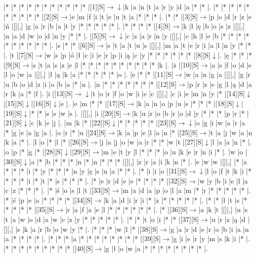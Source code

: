 \documentclass[11pt]{article}
\newcommand\drarr{$\rightarrow \!\!\!\!\! \downarrow$}
\newcommand\rarr{$\rightarrow$}
\newcommand\darr{$\downarrow$}
\begin{document}
\noindent\begin{Puzzle}{22}{29}|*	|*	|*	|*	|*	|*	|*	|*	|*	|*	|*	|[1][S]\drarr	|k	|a	|n	|t	|a	|r	|y	|d	|a	|*	|*	|.
|*	|*	|*	|*	|*	|*	|*	|*	|*	|*	|[2][S]\rarr	|e	|m	|f	|i	|t	|e	|u	|t	|a	|*	|*	|*	|.
|*	|*	|[3][S]\rarr	|p	|o	|d	|r	|z	|e	|ń	|[][,]{ }	|g	|a	|r	|b	|a	|t	|y	|*	|*	|*	|*	|*	|.
|*	|*	|*	|*	|[4][S]\rarr	|k	|ł	|ę	|b	|o	|s	|z	|[][,]{ }	|n	|a	|d	|w	|o	|d	|n	|y	|*	|*	|.
|[5][S]\drarr	|c	|z	|a	|r	|n	|y	|[][,]{ }	|c	|h	|l	|e	|b	|*	|*	|*	|*	|*	|*	|*	|*	|*	|*	|.
|s	|*	|*	|[6][S]\rarr	|s	|t	|a	|t	|u	|s	|[][,]{ }	|m	|a	|t	|e	|r	|i	|a	|l	|n	|y	|*	|*	|.
|t	|[7][S]\rarr	|w	|s	|p	|ó	|ł	|c	|i	|e	|r	|p	|i	|ą	|c	|y	|*	|*	|*	|*	|*	|*	|[8][S]\darr	|.
|ę	|*	|*	|*	|[9][S]\rarr	|s	|t	|a	|s	|z	|e	|l	|*	|*	|*	|*	|*	|*	|*	|*	|*	|*	|k	|.
|ż	|[10][S]\rarr	|a	|s	|f	|o	|d	|e	|l	|o	|w	|a	|[][,]{ }	|ł	|ą	|k	|a	|*	|*	|*	|*	|*	|o	|.
|e	|*	|*	|[11][S]\rarr	|w	|a	|n	|g	|a	|[][,]{ }	|g	|r	|u	|b	|o	|d	|z	|i	|o	|b	|a	|*	|n	|.
|n	|*	|*	|*	|*	|*	|*	|*	|[12][S]\rarr	|p	|r	|z	|e	|g	|l	|ą	|d	|a	|r	|k	|a	|*	|f	|.
|i	|[13][S]\drarr	|t	|o	|r	|f	|o	|w	|i	|e	|c	|[][,]{ }	|c	|i	|e	|m	|n	|y	|*	|[14][S]\darr	|[15][S]\darr	|[16][S]\darr	|e	|.
|e	|m	|*	|*	|[17][S]\rarr	|k	|a	|n	|o	|p	|u	|s	|*	|*	|*	|[18][S]\darr	|[19][S]\darr	|*	|*	|s	|s	|w	|s	|.
|[][,]{ }	|i	|[20][S]\rarr	|k	|u	|r	|o	|b	|r	|o	|d	|y	|*	|*	|*	|p	|r	|*	|[21][S]\darr	|c	|k	|e	|j	|.
|m	|k	|*	|[22][S]\darr	|*	|*	|*	|*	|*	|[23][S]\drarr	|o	|g	|i	|w	|a	|r	|a	|*	|g	|e	|a	|g	|a	|.
|o	|r	|*	|u	|[24][S]\rarr	|k	|a	|p	|e	|l	|a	|n	|*	|[25][S]\rarr	|t	|a	|j	|w	|a	|n	|k	|a	|*	|.
|l	|o	|*	|l	|*	|[26][S]\rarr	|j	|a	|j	|o	|w	|a	|r	|*	|*	|w	|t	|[27][S]\darr	|l	|a	|a	|n	|*	|.
|o	|p	|*	|g	|*	|[28][S]\darr	|[29][S]\rarr	|m	|e	|t	|y	|l	|*	|*	|*	|o	|u	|k	|e	|r	|n	|i	|*	|.
|w	|o	|[30][S]\darr	|a	|*	|b	|*	|*	|*	|n	|*	|n	|*	|*	|*	|[][,]{ }	|z	|r	|a	|i	|k	|n	|*	|.
|e	|w	|w	|[][,]{ }	|*	|a	|*	|*	|*	|i	|*	|y	|*	|*	|*	|n	|y	|ę	|s	|u	|a	|*	|*	|.
|*	|i	|i	|o	|[31][S]\drarr	|l	|o	|f	|t	|k	|i	|*	|*	|*	|*	|i	|*	|t	|*	|s	|*	|*	|*	|.
|*	|e	|r	|d	|e	|e	|*	|*	|*	|*	|[32][S]\rarr	|w	|y	|b	|i	|e	|l	|a	|c	|z	|*	|*	|*	|.
|*	|ś	|o	|s	|l	|t	|[33][S]\rarr	|m	|a	|d	|a	|p	|o	|l	|a	|m	|*	|r	|*	|*	|*	|*	|*	|.
|*	|ć	|p	|e	|a	|*	|*	|*	|*	|[34][S]\rarr	|k	|a	|d	|i	|r	|i	|*	|z	|*	|*	|*	|*	|*	|.
|*	|*	|ł	|t	|s	|*	|*	|*	|*	|*	|[35][S]\rarr	|r	|a	|f	|a	|e	|l	|*	|*	|*	|*	|*	|*	|.
|*	|[36][S]\rarr	|a	|k	|t	|[][,]{ }	|u	|s	|t	|a	|w	|o	|d	|a	|w	|c	|z	|y	|*	|*	|*	|*	|*	|.
|*	|*	|t	|o	|i	|*	|*	|[37][S]\rarr	|u	|r	|z	|ą	|d	|[][,]{ }	|s	|k	|a	|r	|b	|o	|w	|y	|*	|.
|*	|*	|*	|w	|l	|*	|[38][S]\rarr	|g	|a	|r	|d	|e	|r	|o	|b	|i	|a	|n	|a	|*	|*	|*	|*	|.
|*	|*	|*	|a	|*	|*	|*	|*	|*	|*	|*	|*	|[39][S]\rarr	|g	|i	|e	|r	|y	|m	|s	|k	|i	|*	|.
|*	|*	|*	|*	|*	|*	|*	|*	|*	|[40][S]\rarr	|g	|ł	|o	|w	|a	|*	|*	|*	|*	|*	|*	|*	|*	|.\end{Puzzle}
\end{document}
